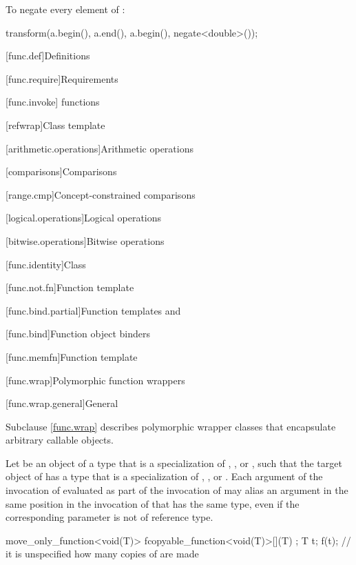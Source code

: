 \pnum
\begin{example}
To negate every element of :

\begin{codeblock}
transform(a.begin(), a.end(), a.begin(), negate<double>());
\end{codeblock}

\end{example}

[func.def]{Definitions}

[func.require]{Requirements}

[func.invoke]{ functions}

[refwrap]{Class template }

[arithmetic.operations]{Arithmetic operations}

[comparisons]{Comparisons}

[range.cmp]{Concept-constrained comparisons}

[logical.operations]{Logical operations}

[bitwise.operations]{Bitwise operations}

[func.identity]{Class }

[func.not.fn]{Function template }

[func.bind.partial]{Function templates  and }

[func.bind]{Function object binders}%

[func.memfn]{Function template }%

[func.wrap]{Polymorphic function wrappers}%

[func.wrap.general]{General}%

\pnum
Subclause \ref{func.wrap} describes polymorphic wrapper classes that
encapsulate arbitrary callable objects.

\pnum
Let  be an object of a type that is a specialization of
, , or ,
such that the target object  of  has a type that
is a specialization of
, , or .
Each argument of the
invocation of  evaluated as part of the invocation of 
may alias an argument in the same position in the invocation of  that
has the same type, even if the corresponding parameter is not of reference type.
\begin{example}
\begin{codeblock}
move_only_function<void(T)>
  f{copyable_function<void(T)>{[](T) {}}};
T t;
f(t);                               // it is unspecified how many copies of  are made
\end{codeblock}
\end{example}

